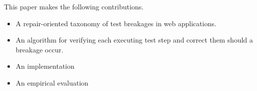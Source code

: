 This paper makes the following contributions.
\begin{itemize}
\item A repair-oriented taxonomy of test breakages in web applications.
\item An algorithm for verifying each executing test step and correct them should a breakage occur. 
\item An implementation 
\item An empirical evaluation 
\end{itemize}









